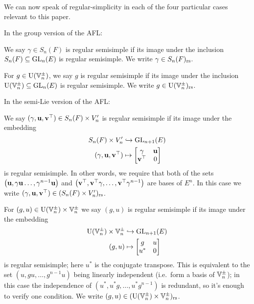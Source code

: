 We can now speak of regular-simplicity in each of the four
particular cases relevant to this paper.
\begin{definition}
  In the group version of the AFL:
  \begin{itemize}
    \ii We say $\gamma \in S_n(F)$ is regular semisimple
    if its image under the inclusion $S_n(F) \subseteq \operatorname{GL}_n(E)$ is regular semisimple.
    We write $\gamma \in S_n(F)_{\mathrm{rs}}$.

    \ii For $g \in \operatorname{U}(\mathbb V_n^\pm)$,
    we say $g$ is regular semisimple
    if its image under the inclusion $\operatorname{U}(\mathbb V_n^\pm) \subseteq \operatorname{GL}_n(E)$ is regular semisimple.
    We write $g \in \operatorname{U}(\mathbb V_n^\pm)_{\mathrm{rs}}$.
  \end{itemize}
  In the semi-Lie version of the AFL:
  \begin{itemize}
    \ii We say $(\gamma, \mathbf u, \mathbf v^\top) \in S_n(F) \times V_n'$
    is regular semisimple if its image under the embedding
    \begin{equation}
      \begin{aligned}
        S_n(F) \times V_n' &\hookrightarrow \operatorname{GL}_{n+1}(E) \\
        (\gamma, \mathbf u, \mathbf v^\top) &\mapsto \begin{bmatrix} \gamma & \mathbf u \\ \mathbf v^\top & 0 \end{bmatrix}
      \end{aligned}
      \label{eq:embed_FJ_analytic}
    \end{equation}
    is regular semisimple.
    In other words, we require that
    both of the sets
    $\left( \mathbf u, \gamma \mathbf u \dots, \gamma^{n-1}\mathbf u \right)$
    and
    $\left( \mathbf v^\top, \mathbf v^\top \gamma, \dots, \mathbf v^\top \gamma^{n-1} \right)$
    are bases of $E^n$.
    In this case we write $(\gamma, \mathbf u, \mathbf v^\top) \in (S_n(F) \times V_n')_{\mathrm{rs}}$.

    \ii For $(g,u) \in \operatorname{U}(\mathbb V_n^\pm) \times \mathbb V_n^\pm$ we say $(g, u)$
    is regular semisimple if its image under the embedding
    \begin{equation}
      \begin{aligned}
        \operatorname{U}(\mathbb V_n^\pm) \times \mathbb V_n^\pm &\hookrightarrow \operatorname{GL}_{n+1}(E) \\
        (g, u) &\mapsto \begin{bmatrix} g & u \\ u^\ast & 0 \end{bmatrix}
      \end{aligned}
      \label{eq:embed_FJ_geometric}
    \end{equation}
    is regular semisimple; here $u^\ast$ is the conjugate transpose.
    This is equivalent to the set $\left(  u, gu, \dots, g^{n-1}u \right)$
    being linearly independent (i.e.\ form a basis of $\mathbb V_n^\pm$);
    in this case the independence of $\left( u^\ast, u^\ast g, \dots, u^\ast g^{n-1} \right)$
    is redundant, so it's enough to verify one condition.
    We write $(g,u) \in (\operatorname{U}(\mathbb V_n^\pm) \times \mathbb V_n^\pm)_{\mathrm{rs}}$.
  \end{itemize}
  \label{def:regular}
\end{definition}

